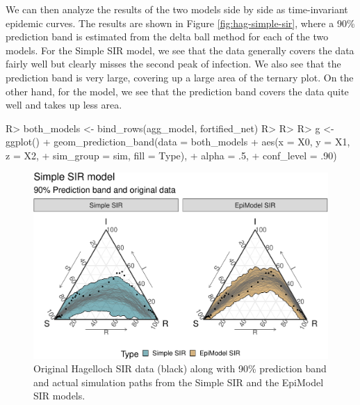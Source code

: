 \documentclass[
  shortnames]{jss}
\begin{document}
We can then analyze the results of the two models side by side as
time-invariant epidemic curves. The results are shown in Figure
\ref{fig:hag-simple-sir}, where a 90\% prediction band is estimated from
the delta ball method for each of the two models. For the Simple SIR
model, we see that the data generally covers the data fairly well but
clearly misses the second peak of infection. We also see that the
prediction band is very large, covering up a large area of the ternary
plot. On the other hand, for the  model, we see that the
prediction band covers the data quite well and takes up less area.

\begin{CodeChunk}
\begin{CodeInput}
R> both_models <- bind_rows(agg_model, fortified_net)
R> 
R> 
R> g <- ggplot() + geom_prediction_band(data = both_models %
+          aes(x = X0, y = X1, z = X2,
+               sim_group = sim, fill = Type),
+          alpha = .5,
+          conf_level = .90) 
\end{CodeInput}
\end{CodeChunk}

\begin{CodeChunk}
\begin{figure}[H]

{\centering \includegraphics{Figs/unnamed-chunk-17-1} 

}

\caption{\label{fig:hag-simple-sir}  Original Hagelloch SIR data (black) along with 90\% prediction band and actual simulation paths from the Simple SIR and the EpiModel SIR models.}\label{fig:unnamed-chunk-17}
\end{figure}
\end{CodeChunk}
\end{document}
